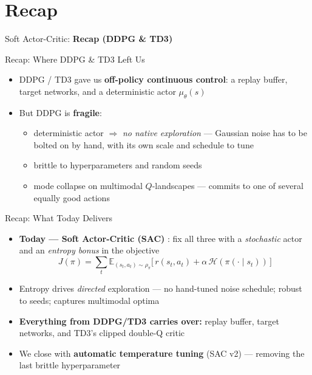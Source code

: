 \section{Recap}
\begin{frame}{}
    \LARGE Soft Actor-Critic: \textbf{Recap (DDPG \& TD3)}
\end{frame}

\begin{frame}{Recap: Where DDPG \& TD3 Left Us}
\begin{itemize}
    \item DDPG  / TD3  gave us \textbf{off-policy continuous control}: a replay buffer, target networks, and a deterministic actor $\mu_\theta(s)$
    \pause
    \item But DDPG is \textbf{fragile}:
    \begin{itemize}
        \item deterministic actor $\Rightarrow$ \emph{no native exploration} --- Gaussian noise has to be bolted on by hand, with its own scale and schedule to tune
        \item brittle to hyperparameters and random seeds
        \item mode collapse on multimodal $Q$-landscapes --- commits to one of several equally good actions
    \end{itemize}
\end{itemize}
\end{frame}

\begin{frame}{Recap: What Today Delivers}
\begin{itemize}
    \item \textbf{Today --- Soft Actor-Critic (SAC)} : fix all three with a \emph{stochastic} actor and an \emph{entropy bonus} in the objective
    $$J(\pi) = \sum_t \mathbb{E}_{(s_t,a_t)\sim\rho_\pi}\big[\, r(s_t,a_t) + \alpha\,\mathcal{H}(\pi(\cdot\mid s_t)) \,\big]$$
    \item Entropy drives \emph{directed} exploration --- no hand-tuned noise schedule; robust to seeds; captures multimodal optima
    \item \textbf{Everything from DDPG/TD3 carries over:} replay buffer, target networks, and TD3's clipped double-Q critic
    \item We close with \textbf{automatic temperature tuning} (SAC v2) --- removing the last brittle hyperparameter
\end{itemize}
\end{frame}

